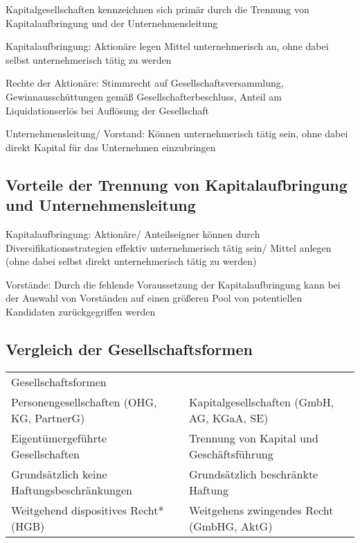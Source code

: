 \documentclass[
]{article}
\begin{document}
Kapitalgesellschaften kennzeichnen sich primär durch die Trennung von
Kapitalaufbringung und der Unternehmensleitung

Kapitalaufbringung: Aktionäre legen Mittel unternehmerisch an, ohne
dabei selbst unternehmerisch tätig zu werden

Rechte der Aktionäre: Stimmrecht auf Gesellschaftsversammlung,
Gewinnausschüttungen gemäß Gesellschafterbeschluss, Anteil am
Liquidationserlös bei Auflösung der Gesellschaft

Unternehmensleitung/ Vorstand: Können unternehmerisch tätig sein, ohne
dabei direkt Kapital für das Unternehmen einzubringen

\hypertarget{vorteile-der-trennung-von-kapitalaufbringung-und-unternehmensleitung}{%
\subsection{Vorteile der Trennung von Kapitalaufbringung und
Unternehmensleitung}\label{vorteile-der-trennung-von-kapitalaufbringung-und-unternehmensleitung}}

Kapitalaufbringung: Aktionäre/ Anteilseigner können durch
Diversifikationsstrategien effektiv unternehmerisch tätig sein/ Mittel
anlegen (ohne dabei selbst direkt unternehmerisch tätig zu werden)

Vorstände: Durch die fehlende Voraussetzung der Kapitalaufbringung kann
bei der Auswahl von Vorständen auf einen größeren Pool von potentiellen
Kandidaten zurückgegriffen werden

\hypertarget{vergleich-der-gesellschaftsformen}{%
\subsection{Vergleich der
Gesellschaftsformen}\label{vergleich-der-gesellschaftsformen}}

\begin{longtable}[]{@{}ll@{}}
\toprule
\endhead
Gesellschaftsformen & \\
Personengesellschaften (OHG, KG, PartnerG) & Kapitalgesellschaften
(GmbH, AG, KGaA, SE) \\
Eigentümergeführte Gesellschaften & Trennung von Kapital und
Geschäftsführung \\
Grundsätzlich keine Haftungsbeschränkungen & Grundsätzlich beschränkte
Haftung \\
Weitgehend dispositives Recht* (HGB) & Weitgehens zwingendes Recht
(GmbHG, AktG) \\
\bottomrule
\end{longtable}
\end{document}
